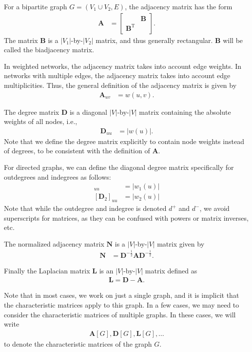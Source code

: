 \documentclass{article}
\begin{document}
For a bipartite graph $G=(V_1 \cup V_2, E)$, the adjacency matrix has
the form 
\begin{align}
  \mathbf A &= \left[ \begin{array}{cc} & \mathbf B \\
      \mathbf B^{\mathrm T} & \end{array} \right].
\end{align}
The matrix $\mathbf B$ is a $|V_1|$-by-$|V_2|$ matrix, and thus
generally rectangular. $\mathbf B$ will be called the biadjacency
matrix. 

In weighted networks, the adjacency matrix takes into account edge
weights.  In networks with multiple edges, the adjacency matrix takes
into account edge multiplicities. Thus, the general definition of the
adjacency matrix is given by
\begin{align}
  \mathbf A_{uv} &= w(u, v). 
\end{align}

The degree matrix $\mathbf D$ is a diagonal $|V|$-by-$|V|$ matrix containing
the absolute weights of all nodes, i.e.,
\begin{align}
  \mathbf D_{uu} &= |w(u)|. 
\end{align}
Note that we define the degree matrix explicitly to contain node weights
instead of degrees, to be consistent with the definition of $\mathbf
A$. 

For directed graphs, we can define the diagonal degree matrix
specifically for outdegrees and indegrees as follows:
\begin{align}
  [\mathbf D_1]_{uu} &= |w_1(u)| \\
  [\mathbf D_2]_{uu} &= |w_2(u)| 
\end{align}
Note that while the outdegree and indegree is denoted $d^+$ and $d^-$, we
avoid superscripts for matrices, as they can be confused with powers or
matrix inverses, etc. 

The normalized adjacency matrix $\mathbf N$ is a $|V|$-by-$|V|$ matrix
given by
\begin{align}
  \mathbf N &= \mathbf D^{-\frac 12} \mathbf A \mathbf D^{-\frac 12}. 
\end{align}

Finally the Laplacian matrix $\mathbf L$ is an $|V|$-by-$|V|$ matrix
defined as
\begin{align}
  \mathbf L = \mathbf D - \mathbf A. 
\end{align}

Note that in most cases, we work on just a single graph, and it is
implicit that the characteristic matrices apply to this graph.  In a few
cases, we may need to consider the characteristic matrices of multiple
graphs.  In these cases, we will write
\begin{align*}
  \mathbf A[G], \mathbf D[G], \mathbf L[G], \dotsc
\end{align*}
to denote the characteristic matrices of the graph $G$. 
\end{document}
